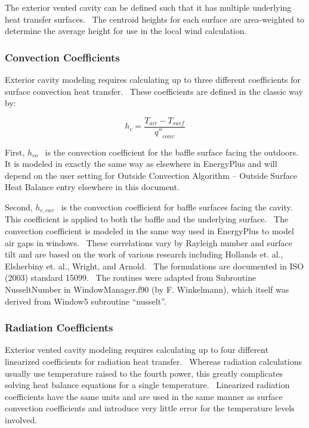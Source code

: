 The exterior vented cavity can be defined such that it has multiple underlying heat transfer surfaces.~ The centroid heights for each surface are area-weighted to determine the average height for use in the local wind calculation.

\subsubsection{Convection Coefficients}\label{convection-coefficients}

Exterior cavity modeling requires calculating up to three different coefficients for surface convection heat transfer.~ These coefficients are defined in the classic way by:

\begin{equation}
{h_c} = \frac{{{T_{air}} - {T_{surf}}}}{{{{q''}_{conv}}}}
\end{equation}

First, \({h_{co}}\) ~is the convection coefficient for the baffle surface facing the outdoors.~ It is modeled in exactly the same way as elsewhere in EnergyPlus and will depend on the user setting for Outside Convection Algorithm -- Outside Surface Heat Balance entry elsewhere in this document.

Second, \({h_{c,cav}}\) ~is the convection coefficient for baffle surfaces facing the cavity.~ This coefficient is applied to both the baffle and the underlying surface.~ The convection coefficient is modeled in the same way used in EnergyPlus to model air gaps in windows.~ These correlations vary by Rayleigh number and surface tilt and are based on the work of various research including Hollands et. al., Elsherbiny et. al., Wright, and Arnold.~ The formulations are documented in ISO (2003) standard 15099.~ The routines were adapted from Subroutine NusseltNumber in WindowManager.f90 (by F. Winkelmann), which itself was derived from Window5 subroutine ``nusselt''.

\subsubsection{Radiation Coefficients}\label{radiation-coefficients}

Exterior vented cavity modeling requires calculating up to four different linearized coefficients for radiation heat transfer.~ Whereas radiation calculations usually use temperature raised to the fourth power, this greatly complicates solving heat balance equations for a single temperature.~ Linearized radiation coefficients have the same units and are used in the same manner as surface convection coefficients and introduce very little error for the temperature levels involved.

